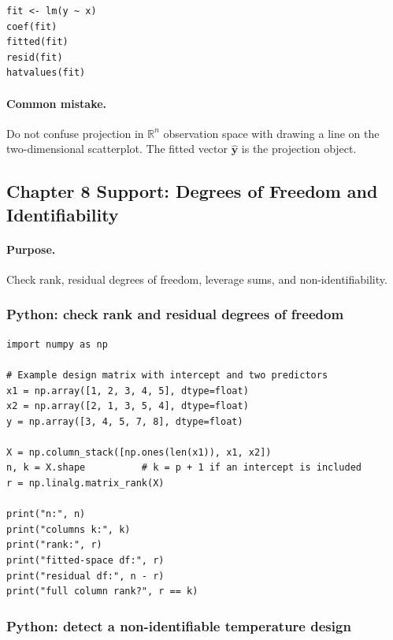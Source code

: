 \begin{verbatim}
fit <- lm(y ~ x)
coef(fit)
fitted(fit)
resid(fit)
hatvalues(fit)
\end{verbatim}

\paragraph{Common mistake.} Do not confuse projection in \(\mathbb{R}^n\) observation space with drawing a line on the two-dimensional scatterplot.  The fitted vector \(\widehat{\mathbf{y}}\) is the projection object.

\subsection{Chapter 8 Support: Degrees of Freedom and Identifiability}
\label{app:ch08-software-cookbook-degrees-of-freedom-and-identifiability}

\paragraph{Purpose.} Check rank, residual degrees of freedom, leverage sums, and non-identifiability.

\subsubsection*{Python: check rank and residual degrees of freedom}

\begin{verbatim}
import numpy as np

# Example design matrix with intercept and two predictors
x1 = np.array([1, 2, 3, 4, 5], dtype=float)
x2 = np.array([2, 1, 3, 5, 4], dtype=float)
y = np.array([3, 4, 5, 7, 8], dtype=float)

X = np.column_stack([np.ones(len(x1)), x1, x2])
n, k = X.shape          # k = p + 1 if an intercept is included
r = np.linalg.matrix_rank(X)

print("n:", n)
print("columns k:", k)
print("rank:", r)
print("fitted-space df:", r)
print("residual df:", n - r)
print("full column rank?", r == k)
\end{verbatim}

\subsubsection*{Python: detect a non-identifiable temperature design}

